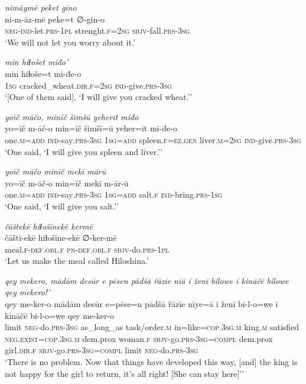\ea \label{ŽP.235}
\textit{nimāymē peket gino} \\ 
\gll ni-m-āz-mē peke=t ∅-gin-o \\ 
 \textsc{neg-}\textsc{ind-}let\textsc{.prs}\textsc{-1pl} strenght\textsc{.f}\textsc{=\textsc{2sg}} \textsc{sbjv-}fall\textsc{.prs}\textsc{-3sg} \\ 
\glt `We will not let you worry about it.'
\z 
 
\ea \label{ŽP.236}
\textit{min hiɫošet miđo’} \\ 
\gll min hiɫoše=t mi-đe-o \\ 
 \textsc{1sg} cracked\_wheat\textsc{.dir}\textsc{.f}\textsc{=\textsc{2sg}} \textsc{ind-}give\textsc{.prs}\textsc{-3sg} \\ 
\glt `[One of them said], ‘I will give you cracked wheat.’'
\z 
 
\ea \label{ŽP.238}
\textit{yoīč māčo, minīč šimšū yeherit miđo} \\ 
\gll yo=īč m-āč-o min=īč šimšī=ū yeher=it mi-đe-o \\ 
 one\textsc{.m}\textsc{=add} \textsc{ind-}say\textsc{.prs}\textsc{-3sg} \textsc{1sg}\textsc{=add} spleen\textsc{.f}\textsc{\textsc{=ez.gen}} liver\textsc{.m}\textsc{=\textsc{2sg}} \textsc{ind-}give\textsc{.prs}\textsc{-3sg} \\ 
\glt `One said, ‘I will give you spleen and liver.’'
\z 
 
\ea \label{ŽP.239}
\textit{yoīč māčo minīč mekī mārū} \\ 
\gll yo=īč m-āč-o min=īč mekī m-ār-ū \\ 
 one\textsc{.m}\textsc{=add} \textsc{ind-}say\textsc{.prs}\textsc{-3sg} \textsc{1sg}\textsc{=add} salt\textsc{.f} \textsc{ind-}bring\textsc{.prs}\textsc{-\textsc{1sg}} \\ 
\glt `One said, ‘I will give you salt.’'
\z 
 
\ea \label{ŽP.241}
\textit{čāštekē hiɫošīnekē kermē} \\ 
\gll čāštī-ekē hiɫošīne-ekē ∅-ker-mē \\ 
 meal\textsc{.f}\textsc{-def}\textsc{.obl}\textsc{.f} \textsc{pn}\textsc{-def}\textsc{.obl}\textsc{.f} \textsc{sbjv-}do\textsc{.prs}\textsc{-1pl} \\ 
\glt `Let us make the meal called Hiloshina.'
\z 
 
\ea \label{ŽP.242}
\textit{qey mekero, mādām desūr e pēsen pādšā řāzīe nīā ī ženī bilowe ī kināčē bilowe qey mekero!’} \\ 
\gll qey me-ker-o mādām desūr e=pēse=n pādšā řāzīe nīye=ā ī ženī bi-l-o=we ī kināčē bi-l-o=we qey me-ker-o \\ 
 limit \textsc{neg-}do\textsc{.prs}\textsc{-3sg} as\_long\_as task/order\textsc{.m} in=like\textsc{=cop}\textsc{.3sg}\textsc{.m} king\textsc{.m} satisfied \textsc{\textsc{neg.}exist}\textsc{=cop}\textsc{.3sg}\textsc{.m} dem.prox woman\textsc{.f} \textsc{sbjv-}go\textsc{.prs}\textsc{-3sg}\textsc{=compl} dem.prox girl\textsc{.dir}\textsc{.f} \textsc{sbjv-}go\textsc{.prs}\textsc{-3sg}\textsc{=compl} limit \textsc{neg-}do\textsc{.prs}\textsc{-3sg} \\ 
\glt `There is no problem. Now that things have developed this way, [and] the king is not happy for the girl to return, it’s all right! [She can stay here]’'
\z 
 
